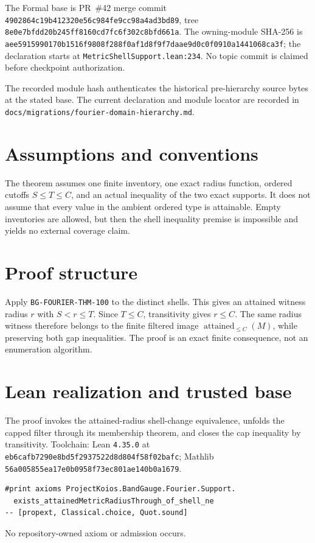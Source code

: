 \documentclass[10pt]{article}
\begin{document}
The Formal base is PR~\#42 merge commit
\texttt{4902864c19b412320e56c984fe9cc98a4ad3bd89}, tree
\texttt{8e0e7bfdd20b245ff8160cd7fc6f302c8bfd661a}. The owning-module SHA-256 is
\texttt{aee5915990170b1516f9808f288f0af1d8f9f7daae9d0c0f0910a1441068ca3f}; the declaration
starts at \texttt{MetricShellSupport.lean:234}. No topic commit is claimed before checkpoint
authorization.

The recorded module hash authenticates the historical pre-hierarchy source bytes at the stated base. The current declaration and module locator are recorded in \texttt{docs/migrations/fourier-domain-hierarchy.md}.

\section{Assumptions and conventions}
The theorem assumes one finite inventory, one exact radius function, ordered cutoffs
$S\le T\le C$, and an actual inequality of the two exact supports. It does not assume that every
value in the ambient ordered type is attainable. Empty inventories are allowed, but then the shell
inequality premise is impossible and yields no external coverage claim.

\section{Proof structure}
Apply \texttt{BG-FOURIER-THM-100} to the distinct shells. This gives an attained witness radius
$r$ with $S<r\le T$. Since $T\le C$, transitivity gives $r\le C$. The same radius witness therefore
belongs to the finite filtered image $\operatorname{attained}_{\le C}(M)$, while preserving both
gap inequalities. The proof is an exact finite consequence, not an enumeration algorithm.

\section{Lean realization and trusted base}
The proof invokes the attained-radius shell-change equivalence, unfolds the capped filter through
its membership theorem, and closes the cap inequality by transitivity. Toolchain: Lean
\texttt{4.35.0} at \texttt{eb6cafb7290e8bd5f2937522d8d804f58f02bafc}; Mathlib
\texttt{56a005855ea17e0b0958f73ec801ae140b0a1679}.
\begin{verbatim}
#print axioms ProjectKoios.BandGauge.Fourier.Support.
  exists_attainedMetricRadiusThrough_of_shell_ne
-- [propext, Classical.choice, Quot.sound]
\end{verbatim}
No repository-owned axiom or admission occurs.
\end{document}
